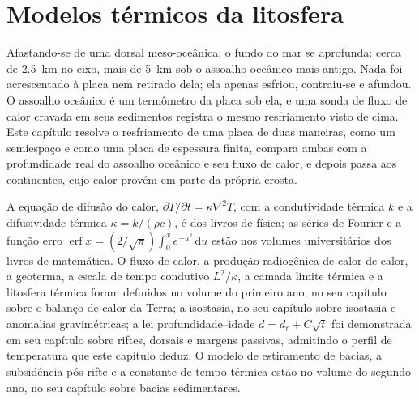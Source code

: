 \chapter{Modelos térmicos da litosfera}\label{ch:b3:lithosphere-thermal-models}

Afastando-se de uma dorsal meso-oceânica, o fundo do mar se aprofunda: cerca de
\qty{2.5}{km} no eixo, mais de \qty{5}{km} sob o assoalho oceânico
mais antigo. Nada foi acrescentado à placa nem retirado dela; ela apenas
esfriou, contraiu-se e afundou. O assoalho oceânico é um termômetro da placa
sob ela, e uma sonda de fluxo de calor cravada em seus sedimentos registra o mesmo
resfriamento visto de cima. Este capítulo resolve o resfriamento de uma placa de duas maneiras, como
um semiespaço e como uma placa de espessura finita, compara ambas com a profundidade
real do assoalho oceânico e seu fluxo de calor, e depois passa aos continentes,
cujo calor provém em parte da própria crosta.

\begin{recall}
A equação de difusão do calor, $\partial T/\partial t = \kappa\nabla^2T$,
com a condutividade térmica $k$ e a difusividade térmica $\kappa =
k/(\rho c)$, é dos livros de física; as séries de Fourier e a função erro
$\operatorname{erf}x = (2/\sqrt\pi)\int_0^xe^{-u^2}\,\mathrm du$ estão nos
volumes universitários dos livros de matemática. O fluxo de calor, a produção radiogênica de calor
de calor, a geoterma, a escala de tempo condutivo $L^2/\kappa$, a camada limite térmica
e a litosfera térmica foram definidos no volume do primeiro ano, no
seu capítulo sobre o balanço de calor da Terra; a isostasia, no seu capítulo sobre isostasia
e anomalias gravimétricas; a lei profundidade--idade $d = d_r + C\sqrt t$ foi demonstrada em
seu capítulo sobre riftes, dorsais e margens passivas, admitindo o perfil de temperatura
que este capítulo deduz. O modelo de estiramento de bacias, a subsidência pós-rifte
e a constante de tempo térmica estão no volume do segundo ano, no seu
capítulo sobre bacias sedimentares.
\end{recall}

